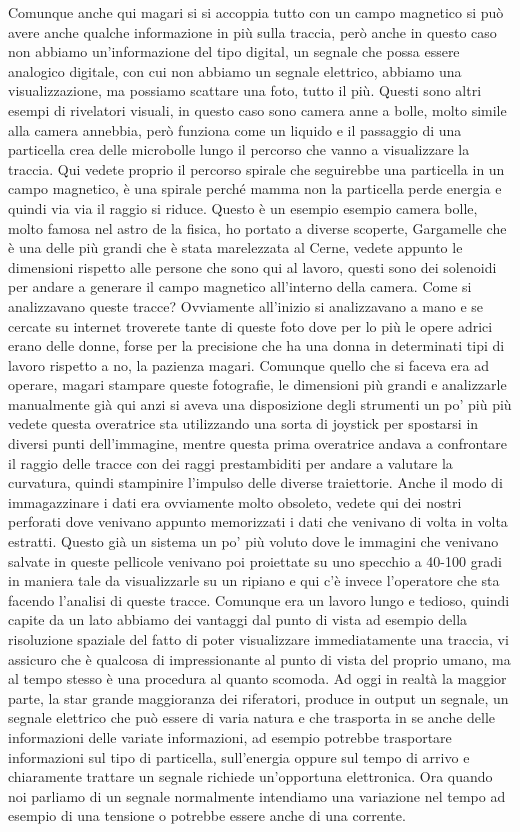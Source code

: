 Comunque anche qui magari si si accoppia tutto con un campo magnetico si può avere anche qualche informazione in più sulla traccia, però anche in questo caso non abbiamo un'informazione del tipo digital, un segnale che possa essere analogico digitale, con cui non abbiamo un segnale elettrico, abbiamo una visualizzazione, ma possiamo scattare una foto, tutto il più. Questi sono altri esempi di rivelatori visuali, in questo caso sono camera anne a bolle, molto simile alla camera annebbia, però funziona come un liquido e il passaggio di una particella crea delle microbolle lungo il percorso che vanno a visualizzare la traccia. Qui vedete proprio il percorso spirale che seguirebbe una particella in un campo magnetico, è una spirale perché mamma non la particella perde energia e quindi via via il raggio si riduce. Questo è un esempio esempio camera bolle, molto famosa nel astro de la fisica, ho portato a diverse scoperte, Gargamelle che è una delle più grandi che è stata marelezzata al Cerne, vedete appunto le dimensioni rispetto alle persone che sono qui al lavoro, questi sono dei solenoidi per andare a generare il campo magnetico all'interno della camera. Come si analizzavano queste tracce? Ovviamente all'inizio si analizzavano a mano e se cercate su internet troverete tante di queste foto dove per lo più le opere adrici erano delle donne, forse per la precisione che ha una donna in determinati tipi di lavoro rispetto a no, la pazienza magari. Comunque quello che si faceva era ad operare, magari stampare queste fotografie, le dimensioni più grandi e analizzarle manualmente già qui anzi si aveva una disposizione degli strumenti un po' più più vedete questa overatrice sta utilizzando una sorta di joystick per spostarsi in diversi punti dell'immagine, mentre questa prima overatrice andava a confrontare il raggio delle tracce con dei raggi prestambiditi per andare a valutare la curvatura, quindi stampinire l'impulso delle diverse traiettorie. Anche il modo di immagazzinare i dati era ovviamente molto obsoleto, vedete qui dei nostri perforati dove venivano appunto memorizzati i dati che venivano di volta in volta estratti. Questo già un sistema un po' più voluto dove le immagini che venivano salvate in queste pellicole venivano poi proiettate su uno specchio a 40-100 gradi in maniera tale da visualizzarle su un ripiano e qui c'è invece l'operatore che sta facendo l'analisi di queste tracce. Comunque era un lavoro lungo e tedioso, quindi capite da un lato abbiamo dei vantaggi dal punto di vista ad esempio della risoluzione spaziale del fatto di poter visualizzare immediatamente una traccia, vi assicuro che è qualcosa di impressionante al punto di vista del proprio umano, ma al tempo stesso è una procedura al quanto scomoda. Ad oggi in realtà la maggior parte, la star grande maggioranza dei riferatori, produce in output un segnale, un segnale elettrico che può essere di varia natura e che trasporta in se anche delle informazioni delle variate informazioni, ad esempio potrebbe trasportare informazioni sul tipo di particella, sull'energia oppure sul tempo di arrivo e chiaramente trattare un segnale richiede un'opportuna elettronica. Ora quando noi parliamo di un segnale normalmente intendiamo una variazione nel tempo ad esempio di una tensione o potrebbe essere anche di una corrente. 